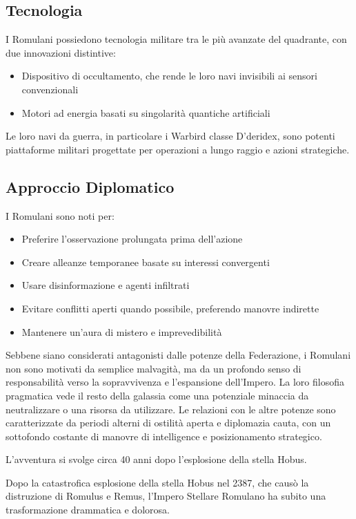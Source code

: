 \documentclass[letterpaper,twocolumn,openany,nodeprecatedcode]{dndbook}
\begin{document}
\subsection{Tecnologia}
I Romulani possiedono tecnologia militare tra le più avanzate del quadrante, con due innovazioni distintive:

\begin{itemize}
    \item Dispositivo di occultamento, che rende le loro navi invisibili ai sensori convenzionali
    \item Motori ad energia basati su singolarità quantiche artificiali
\end{itemize}

Le loro navi da guerra, in particolare i Warbird classe D'deridex, sono potenti piattaforme militari progettate per operazioni a lungo raggio e azioni strategiche.

\subsection{Approccio Diplomatico}
I Romulani sono noti per:

\begin{itemize}
    \item Preferire l'osservazione prolungata prima dell'azione
    \item Creare alleanze temporanee basate su interessi convergenti
    \item Usare disinformazione e agenti infiltrati
    \item Evitare conflitti aperti quando possibile, preferendo manovre indirette
    \item Mantenere un'aura di mistero e imprevedibilità
\end{itemize}

Sebbene siano considerati antagonisti dalle potenze della Federazione, i Romulani non sono motivati da semplice malvagità, ma da un profondo senso di responsabilità verso la sopravvivenza e l'espansione dell'Impero. La loro filosofia pragmatica vede il resto della galassia come una potenziale minaccia da neutralizzare o una risorsa da utilizzare.
Le relazioni con le altre potenze sono caratterizzate da periodi alterni di ostilità aperta e diplomazia cauta, con un sottofondo costante di manovre di intelligence e posizionamento strategico.

L'avventura si svolge circa 40 anni dopo l'esplosione della stella Hobus.

Dopo la catastrofica esplosione della stella Hobus nel 2387, che causò la distruzione di Romulus e Remus, l'Impero Stellare Romulano ha subito una trasformazione drammatica e dolorosa.
\end{document}
